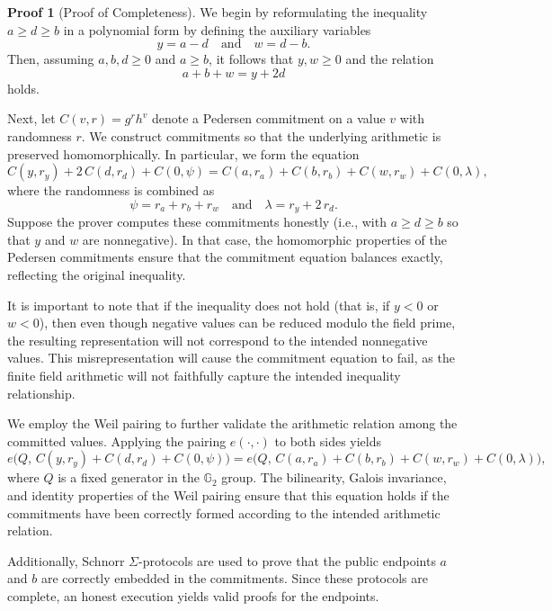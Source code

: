 \documentclass{iacrcc}
\theoremstyle{definition}
\newtheorem{namedproof}{Proof}
\begin{document}
\begin{namedproof}[Proof of Completeness]
  We begin by reformulating the inequality \(a \geq d \geq b\) in a polynomial form by defining the auxiliary variables
  \[
  y = a - d \quad \text{and} \quad w = d - b.
  \]
  Then, assuming \(a, b, d \geq 0\) and \(a \geq b\), it follows that \(y, w \geq 0\) and the relation
  \[
  a + b + w = y + 2d
  \]
  holds.
  
  Next, let \( C(v, r) = g^{r} h^{v} \) denote a Pedersen commitment on a value \(v\) with randomness \(r\). We construct commitments so that the underlying arithmetic is preserved homomorphically. In particular, we form the equation
  \[
  C(y, r_y) + 2\,C(d, r_d) + C(0, \psi) = C(a, r_a) + C(b, r_b) + C(w, r_w) + C(0, \lambda),
  \]
  where the randomness is combined as
  \[
  \psi = r_a + r_b + r_w \quad \text{and} \quad \lambda = r_y + 2\,r_d.
  \]
  Suppose the prover computes these commitments honestly (i.e., with \(a \geq d \geq b\) so that \(y\) and \(w\) are nonnegative). In that case, the homomorphic properties of the Pedersen commitments ensure that the commitment equation balances exactly, reflecting the original inequality.
  
  It is important to note that if the inequality does not hold (that is, if \(y < 0\) or \(w < 0\)), then even though negative values can be reduced modulo the field prime, the resulting representation will not correspond to the intended nonnegative values. This misrepresentation will cause the commitment equation to fail, as the finite field arithmetic will not faithfully capture the intended inequality relationship.
  
  We employ the Weil pairing to further validate the arithmetic relation among the committed values. Applying the pairing \(e(\cdot,\cdot)\) to both sides yields
  \[
  e\Big(Q,\, C(y, r_y) + C(d, r_d) + C(0, \psi)\Big) = e\Big(Q,\, C(a, r_a) + C(b, r_b) + C(w, r_w) + C(0, \lambda)\Big),
  \]
  where \(Q\) is a fixed generator in the \( \mathbb{G}_{2} \) group. The bilinearity, Galois invariance, and identity properties of the Weil pairing ensure that this equation holds if the commitments have been correctly formed according to the intended arithmetic relation.
  
  Additionally, Schnorr \(\Sigma\)-protocols are used to prove that the public endpoints \(a\) and \(b\) are correctly embedded in the commitments. Since these protocols are complete, an honest execution yields valid proofs for the endpoints.
  

\end{namedproof}
\end{document}

